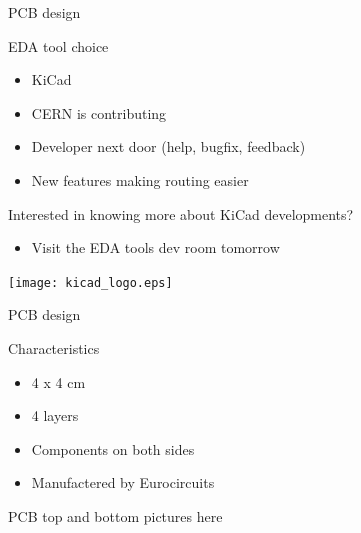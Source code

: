 \documentclass[compress,red]{beamer}
\begin{document}
\begin{frame}{PCB design}

  \begin{block}{EDA tool choice}
    \begin{itemize}
    \item KiCad
    \item CERN is contributing
    \item Developer next door (help, bugfix, feedback)
    \item New features making routing easier
    \end{itemize}
  \end{block}

  \begin{block}{Interested in knowing more about KiCad developments?}
    \begin{itemize}
    \item Visit the EDA tools dev room tomorrow
    \end{itemize}
  \end{block}

  \begin{center}
    \texttt{[image: kicad\_logo.eps]}
  \end{center}

  \note[item]{}

\end{frame}

\begin{frame}{PCB design}

  \begin{block}{Characteristics}
    \begin{itemize}
    \item 4 x 4 cm
    \item 4 layers
    \item Components on both sides
    \item Manufactered by Eurocircuits
    \end{itemize}
  \end{block}

  \begin{center}
    PCB top and bottom pictures here
  \end{center}

  \note[item]{}

\end{frame}
\end{document}
